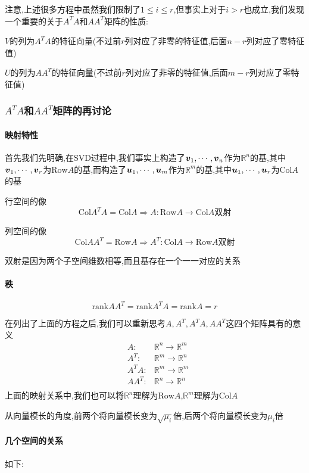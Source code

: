 \documentclass{article}
\newcommand{\RR}{\mathbb{R}}
\newcommand{\col}{\text{Col}}
\newcommand{\row}{\text{Row}}
\newcommand{\rank}{\text{rank}}
\begin{document}
\begin{CJK}{UTF8}{gkai}
注意,上述很多方程中虽然我们限制了$1\leq i \leq r$,但事实上对于$i > r$也成立,我们发现一个重要的关于$A^T A$和$AA^T$矩阵的性质:

$V$的列为$A^T A$的特征向量(不过前$r$列对应了非零的特征值,后面$n - r$列对应了零特征值)

$U$的列为$AA^T$的特征向量(不过前$r$列对应了非零的特征值,后面$m - r$列对应了零特征值)
\subsubsection{$A^T A$和$AA^T$矩阵的再讨论}

\paragraph{映射特性\\}
首先我们先明确,在SVD过程中,我们事实上构造了$\boldsymbol{v}_{1},\cdots,\boldsymbol{v}_{n}$作为$\RR^n$的基,其中$\boldsymbol{v}_{1},\cdots,\boldsymbol{v}_{r}$为$\row A$的基,而构造了$\boldsymbol{u}_{1},\cdots,\boldsymbol{u}_{m}$作为$\RR^m$的基,其中$\boldsymbol{u}_{1},\cdots,\boldsymbol{u}_{r}$为$\col A$的基

行空间的像
\[\col A^T A = \col A \Rightarrow A: \row A \to \col A\text{双射}\]

列空间的像
\[\col A A^T = \row A \Rightarrow A^T: \col A \to \row A\text{双射}\]

双射是因为两个子空间维数相等,而且基存在一个一一对应的关系
\paragraph{秩}
\[\rank AA^T = \rank A^T A = \rank A = r\]

在列出了上面的方程之后,我们可以重新思考$A,A^T,A^T A,AA^T$这四个矩阵具有的意义\\
\[
\begin{aligned}
&A: &\RR^n \rightarrow \RR^m\\
&A^T: &\RR^m \rightarrow \RR^n\\
&A^T A: &\RR^m \rightarrow \RR^m\\
&AA^T: &\RR^n \rightarrow \RR^n\\
\end{aligned}
\]
上面的映射关系中,我们也可以将$\RR^n$理解为$\row A$,$\RR^m$理解为$\col A$

从向量模长的角度,前两个将向量模长变为$\sqrt{\mu_i}$倍,后两个将向量模长变为$\mu_i$倍

\paragraph{几个空间的关系}
如下:


\end{CJK}
\end{document}
